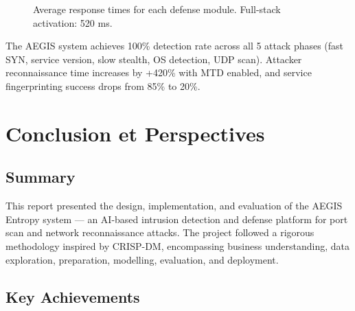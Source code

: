\documentclass[12pt,a4paper]{report}
\begin{document}
\begin{figure}[H]
\centering
{}
\caption{Average response times for each defense module. Full-stack activation: 520 ms.}
\label{fig:timing}
\end{figure}

The AEGIS system achieves 100\% detection rate across all 5 attack phases (fast SYN, service version, slow stealth, OS detection, UDP scan). Attacker reconnaissance time increases by +420\% with MTD enabled, and service fingerprinting success drops from 85\% to 20\%.

\chapter{Conclusion et Perspectives}\label{ch:conclusion}

\section{Summary}

This report presented the design, implementation, and evaluation of the AEGIS Entropy system --- an AI-based intrusion detection and defense platform for port scan and network reconnaissance attacks. The project followed a rigorous methodology inspired by CRISP-DM, encompassing business understanding, data exploration, preparation, modelling, evaluation, and deployment.

\section{Key Achievements}
\end{document}
